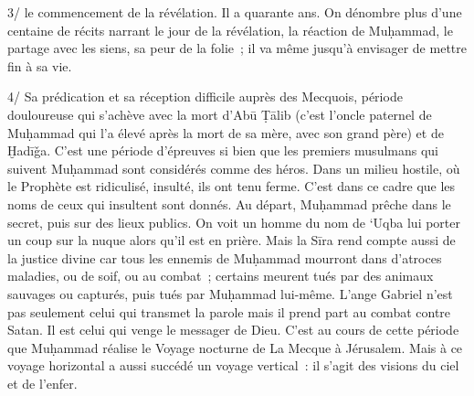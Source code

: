 3/ le commencement de la révélation. Il a quarante ans. On dénombre plus
d'une centaine de récits narrant le jour de la révélation, la réaction
de Muḥammad, le partage avec les siens, sa peur de la folie~; il va même
jusqu'à envisager de mettre fin à sa vie.

4/ Sa prédication et sa réception difficile auprès des Mecquois, période
douloureuse qui s'achève avec la mort d'Abū Ṭālib (c'est l'oncle
paternel de Muḥammad qui l'a élevé après la mort de sa mère, avec son
grand père) et de Ḫadīǧa. C'est une période d'épreuves si bien que les
premiers musulmans qui suivent Muḥammad sont considérés comme des héros.
Dans un milieu hostile, où le Prophète est ridiculisé, insulté, ils ont
tenu ferme. C'est dans ce cadre que les noms de ceux qui insultent sont
donnés. Au départ, Muḥammad prêche dans le secret, puis sur des lieux
publics. On voit un homme du nom de `Uqba lui porter un coup sur la
nuque alors qu'il est en prière. Mais la Sīra rend compte aussi de la
justice divine car tous les ennemis de Muḥammad mourront dans d'atroces
maladies, ou de soif, ou au combat~; certains meurent tués par des
animaux sauvages ou capturés, puis tués par Muḥammad lui-même. L'ange
Gabriel n'est pas seulement celui qui transmet la parole mais il prend
part au combat contre Satan. Il est celui qui venge le messager de Dieu.
C'est au cours de cette période que Muḥammad réalise le Voyage nocturne
de La Mecque à Jérusalem. Mais à ce voyage horizontal a aussi succédé un
voyage vertical~: il s'agit des visions du ciel et de l'enfer.

